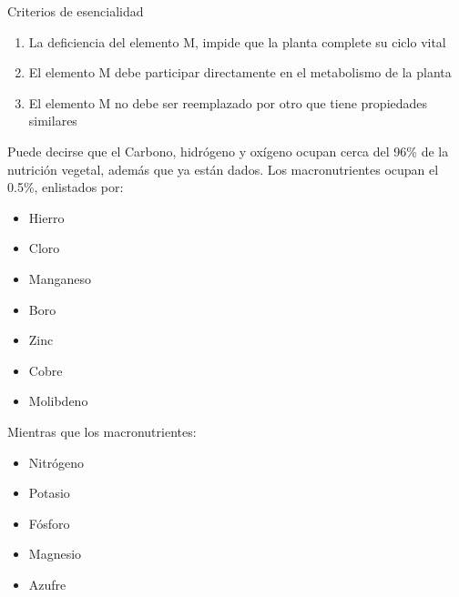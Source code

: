 Criterios de esencialidad
\begin{enumerate}
    \item La deficiencia del elemento M, impide que la planta complete su ciclo vital
    \item El elemento M debe participar directamente en el metabolismo de la planta
    \item El elemento M no debe ser reemplazado por otro que tiene propiedades similares
\end{enumerate}

Puede decirse que el Carbono, hidrógeno y oxígeno ocupan cerca del 96\% de la nutrición vegetal, además que ya están dados.
Los macronutrientes ocupan el 0.5\%, enlistados por:
\begin{itemize}
    \item Hierro
    \item Cloro
    \item Manganeso
    \item Boro
    \item Zinc
    \item Cobre
    \item Molibdeno
\end{itemize}
Mientras que los macronutrientes:
\begin{itemize}
    \item Nitrógeno
    \item Potasio
    \item Fósforo
    \item Magnesio
    \item Azufre
\end{itemize}


